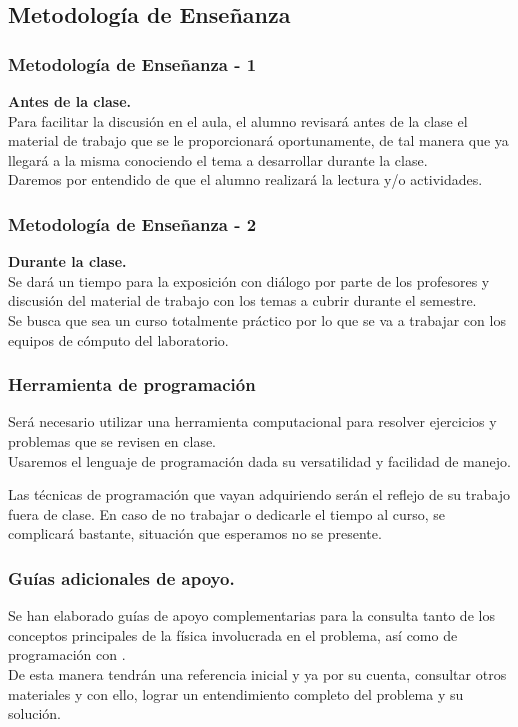 \subsection{Metodología de Enseñanza}
\begin{frame}
\frametitle{Metodología de Enseñanza - 1}
\textbf{Antes de la clase.}
\\
\medskip
Para facilitar la discusión en el aula, el alumno revisará antes de la clase el material de trabajo que se le proporcionará oportunamente, de tal manera que ya llegará a la misma conociendo el tema a desarrollar durante la clase.
\\
\bigskip
Daremos por entendido de que el alumno realizará la lectura y/o actividades.
\end{frame}
\begin{frame}	
\frametitle{Metodología de Enseñanza - 2}
\textbf{Durante la clase.}
\\
\medskip
Se dará un tiempo para la exposición con diálogo por parte de los profesores y discusión del material de trabajo con los temas a cubrir durante el semestre.
\\
\bigskip
Se busca que sea un curso totalmente práctico por lo que se va a trabajar con los equipos de cómputo del laboratorio.
\end{frame}
\begin{frame}
\frametitle{Herramienta de programación}
Será necesario utilizar una herramienta computacional para resolver ejercicios y problemas que se revisen en clase.
\\
\bigskip
Usaremos el lenguaje de programación  dada su versatilidad y facilidad de manejo.
\end{frame}
\begin{frame}
Las técnicas de programación que vayan adquiriendo serán el reflejo de su trabajo fuera de clase. En caso de no trabajar o dedicarle el tiempo al curso, se complicará bastante, situación que esperamos no se presente.
\end{frame}
\begin{frame}
\frametitle{Guías adicionales de apoyo.}
Se han elaborado guías de apoyo complementarias para la consulta tanto de los conceptos principales de la física involucrada en el problema, así como de programación con .
\\
\bigskip
De esta manera tendrán una referencia inicial y ya por su cuenta, consultar otros materiales y con ello, lograr un entendimiento completo del problema y su solución.
\end{frame}
